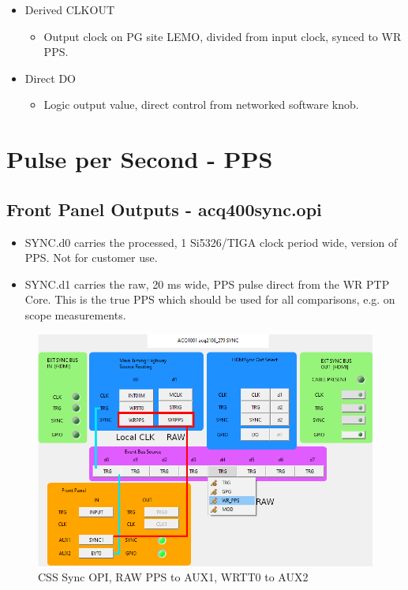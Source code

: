 \documentclass[]{article}
\begin{document}
\begin{itemize}
\begin{itemize}
	\end{itemize}
	\item Derived CLKOUT
	\begin{itemize}
		\item Output clock on PG site LEMO, divided from input clock, synced to WR PPS.
	\end{itemize}
	\item Direct DO
	\begin{itemize}
		\item Logic output value, direct control from networked software knob.
	\end{itemize}
\end{itemize}
 
\section{Pulse per Second - PPS}
\subsection{Front Panel Outputs - acq400sync.opi}
\begin{itemize}
	\item SYNC.d0 carries the processed, 1 Si5326/TIGA clock period wide, version of PPS. Not for customer use.
	\item SYNC.d1 carries the raw, 20 ms wide,  PPS pulse direct from the WR PTP Core. This is the true PPS which should be used for all comparisons, e.g. on scope measurements.
\end{itemize}

\begin{figure}[H]
	\centering
	\includegraphics[height=0.5\textwidth]{images/evt_wr_pps_mod}
	\caption{CSS Sync OPI, RAW PPS to AUX1, WRTT0 to AUX2}
	\label{fig:syncopi}
\end{figure}
\end{document}
